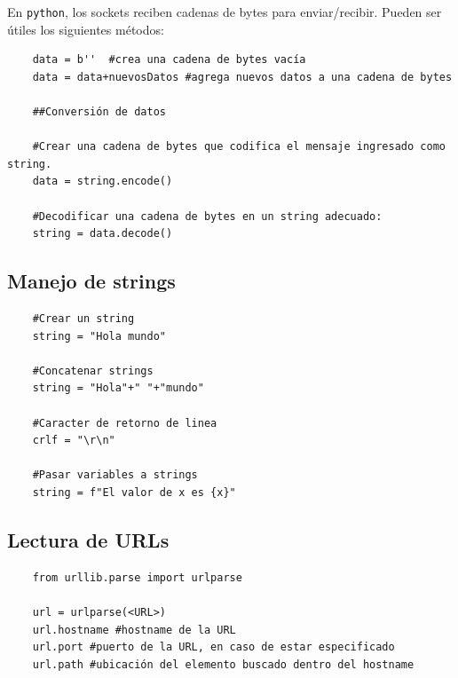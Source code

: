 \documentclass[a4paper,10pt]{article}
\begin{document}
En \texttt{python}, los sockets reciben cadenas de bytes para enviar/recibir. Pueden ser útiles los siguientes métodos:

\begin{verbatim}
    data = b''  #crea una cadena de bytes vacía
    data = data+nuevosDatos #agrega nuevos datos a una cadena de bytes

    ##Conversión de datos

    #Crear una cadena de bytes que codifica el mensaje ingresado como string.
    data = string.encode()
    
    #Decodificar una cadena de bytes en un string adecuado:
    string = data.decode()
\end{verbatim}

\subsection*{Manejo de strings}

\begin{verbatim}
    #Crear un string
    string = "Hola mundo"
    
    #Concatenar strings
    string = "Hola"+" "+"mundo"

    #Caracter de retorno de linea
    crlf = "\r\n"

    #Pasar variables a strings
    string = f"El valor de x es {x}"
\end{verbatim}


\subsection*{Lectura de URLs}

\begin{verbatim}
    from urllib.parse import urlparse

    url = urlparse(<URL>)
    url.hostname #hostname de la URL
    url.port #puerto de la URL, en caso de estar especificado
    url.path #ubicación del elemento buscado dentro del hostname
\end{verbatim}
\end{document}
